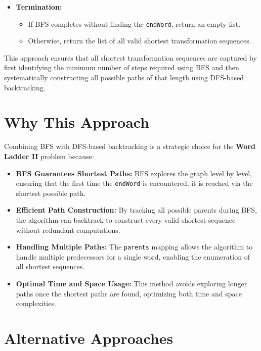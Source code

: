 \begin{itemize}
    \item \textbf{Termination:}
    \begin{itemize}
        \item If BFS completes without finding the \texttt{endWord}, return an empty list.
        \item Otherwise, return the list of all valid shortest transformation sequences.
    \end{itemize}
\end{itemize}

This approach ensures that all shortest transformation sequences are captured by first identifying the minimum number of steps required using BFS and then systematically constructing all possible paths of that length using DFS-based backtracking.

\section*{Why This Approach}

Combining BFS with DFS-based backtracking is a strategic choice for the \textbf{Word Ladder II} problem because:

\begin{itemize}
    \item \textbf{BFS Guarantees Shortest Paths:} BFS explores the graph level by level, ensuring that the first time the \texttt{endWord} is encountered, it is reached via the shortest possible path.
    
    \item \textbf{Efficient Path Construction:} By tracking all possible parents during BFS, the algorithm can backtrack to construct every valid shortest sequence without redundant computations.
    
    \item \textbf{Handling Multiple Paths:} The \texttt{parents} mapping allows the algorithm to handle multiple predecessors for a single word, enabling the enumeration of all shortest sequences.
    
    \item \textbf{Optimal Time and Space Usage:} This method avoids exploring longer paths once the shortest paths are found, optimizing both time and space complexities.
\end{itemize}

\section*{Alternative Approaches}

